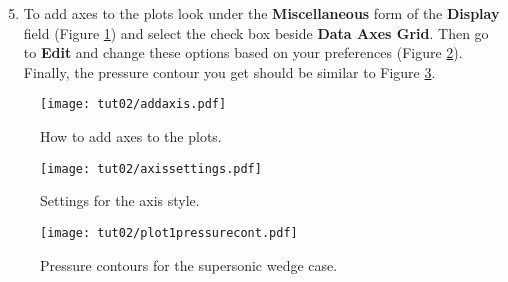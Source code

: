 \begin{enumerate}[label=\arabic*)]
	\setcounter{enumi}{4}
	\item To add axes to the plots look under the \textbf{Miscellaneous} form of the \textbf{Display} field (Figure \ref{fig2:add axis}) and select the check box beside \textbf{Data Axes Grid}. Then go to \textbf{Edit} and change these options based on your preferences (Figure \ref{fig2:axis setting}). Finally, the pressure contour you get should be similar to Figure \ref{fig2:plot pressure cont1}.
\end{enumerate}
\begin{figure}[H]
    \centering
    \texttt{[image: tut02/addaxis.pdf]}
    \caption{How to add axes to the plots.}
    \label{fig2:add axis}
\end{figure}
\begin{figure}[ht]
    \centering
    \texttt{[image: tut02/axissettings.pdf]}
    \caption{Settings for the axis style.}
    \label{fig2:axis setting}
\end{figure}
\begin{figure}[ht]
    \centering
    \texttt{[image: tut02/plot1pressurecont.pdf]}
    \caption{Pressure contours for the supersonic wedge case.}
    \label{fig2:plot pressure cont1}
\end{figure}


